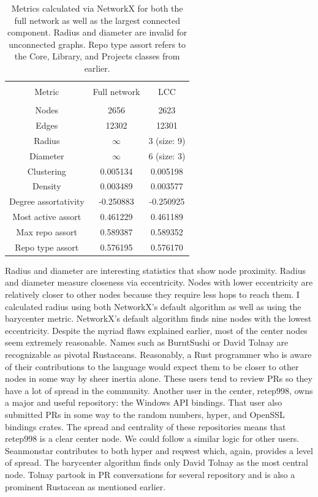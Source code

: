 \documentclass[12pt, a4paper]{article}
\begin{document}
\begin{table}
    \centering
    \begin{tabular}{ccc}
        \hline\\
        Metric & Full network & LCC\\
        \hline\\
        Nodes & 2656 & 2623\\
        Edges & 12302 & 12301\\
        Radius & $\infty$ & 3 (size: 9)\\
        Diameter & $\infty$ & 6 (size: 3)\\
        Clustering & 0.005134 & 0.005198\\
        Density & 0.003489 & 0.003577\\
        Degree assortativity & -0.250883 & -0.250925\\
        Most active assort & 0.461229 & 0.461189\\
        Max repo assort & 0.589387 & 0.589352\\
        Repo type assort & 0.576195 & 0.576170\\
        \hline
    \end{tabular}
    \caption{Metrics calculated via NetworkX for both the full network as well as the largest connected component. Radius and diameter are invalid for unconnected graphs. Repo type assort refers to the Core, Library, and Projects classes from earlier.}
    \label{tab:netresults}
\end{table}

Radius and diameter are interesting statistics that show node proximity. Radius and diameter measure closeness via eccentricity. Nodes with lower eccentricity are relatively closer to other nodes because they require less hops to reach them. I calculated radius using both NetworkX's default algorithm as well as using the barycenter metric. NetworkX's default algorithm finds nine nodes with the lowest eccentricity. Despite the myriad flaws explained earlier, most of the center nodes seem extremely reasonable. Names such as BurntSushi or David Tolnay are recognizable as pivotal Rustaceans. Reasonably, a Rust programmer who is aware of their contributions to the language would expect them to be closer to other nodes in some way by sheer inertia alone. These users tend to review PRs so they have a lot of spread in the community. Another user in the center, retep998, owns a major and useful repository: the Windows API bindings. That user also submitted PRs in some way to the random numbers, hyper, and OpenSSL bindings crates. The spread and centrality of these repositories means that retep998 is a clear center node. We could follow a similar logic for other users. Seanmonstar contributes to both hyper and reqwest which, again, provides a level of spread. The barycenter algorithm finds only David Tolnay as the most central node. Tolnay partook in PR conversations for several repository and is also a prominent Rustacean as mentioned earlier.
\end{document}
